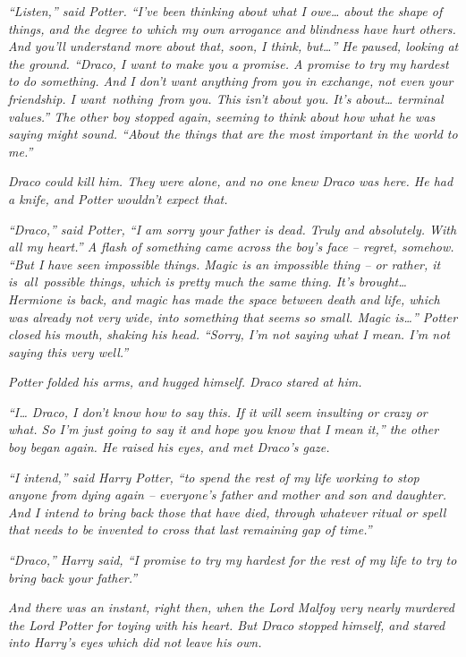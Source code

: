 \emph{``Listen,'' said Potter. ``I've been thinking about what I
owe\ldots{} about the shape of things, and the degree to which my own
arrogance and blindness have hurt others. And you'll understand more
about that, soon, I think, but\ldots{}'' He paused, looking at the
ground. ``Draco, I want to make you a promise. A promise to try my
hardest to do something. And I don't want anything from you in exchange,
not even your friendship. I want\emph{~nothing~}from you. This isn't
about you. It's about\ldots{} terminal values.'' The other boy stopped
again, seeming to think about how what he was saying might sound.
``About the things that are the most important in the world to me.''}

\emph{Draco could kill him. They were alone, and no one knew Draco was
here. He had a knife, and Potter wouldn't expect that.}

\emph{``Draco,'' said Potter, ``I am sorry your father is dead. Truly
and absolutely. With all my heart.'' A flash of something came across
the boy's face -- regret, somehow. ``But I have seen impossible things.
Magic is an impossible thing -- or rather, it is\emph{~all~}possible
things, which is pretty much the same thing. It's brought\ldots{}
Hermione is back, and magic has made the space between death and life,
which was already not very wide, into something that seems so small.
Magic is\ldots{}'' Potter closed his mouth, shaking his head. ``Sorry,
I'm not saying what I mean. I'm not saying this very well.''}

\emph{Potter folded his arms, and hugged himself. Draco stared at him.}

\emph{``I\ldots{} Draco, I don't know how to say this. If it will seem
insulting or crazy or what. So I'm just going to say it and hope you
know that I mean it,'' the other boy began again. He raised his eyes,
and met Draco's gaze.}

\emph{``I intend,'' said Harry Potter, ``to spend the rest of my life
working to stop anyone from dying again -- everyone's father and mother
and son and daughter. And I intend to bring back those that have died,
through whatever ritual or spell that needs to be invented to cross that
last remaining gap of time.''}

\emph{``Draco,'' Harry said, ``I promise to try my hardest for the rest
of my life to try to bring back your father.''}

\emph{And there was an instant, right then, when the Lord Malfoy very
nearly murdered the Lord Potter for toying with his heart. But Draco
stopped himself, and stared into Harry's eyes which did not leave his
own.}

